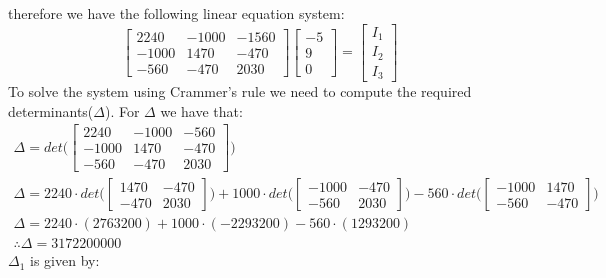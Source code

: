 \documentclass[letterpaper]{article}
\begin{document}
    therefore we have the following linear equation system:
    \[
        \begin{bmatrix}
            2240 & -1000 & -1560\\
            -1000 & 1470 & -470\\
            -560 & -470 & 2030
        \end{bmatrix}
    \begin{bmatrix}
        -5\\
        9\\
        0
    \end{bmatrix}
    =
    \begin{bmatrix}
        I_1\\
        I_2\\
        I_3
    \end{bmatrix}
\]
To solve the system using Crammer's rule we need to compute the required determinants($\Delta$). For
$\Delta$ we have that:
    \begin{gather*}
        \Delta = det\Bigg(
        \begin{bmatrix}
            2240 & -1000 & -560\\
            -1000 & 1470 & -470\\
            -560 & -470 & 2030
        \end{bmatrix}
        \Bigg)\\
        \Delta = 2240\cdot det\bigg(
        \begin{bmatrix}
            1470 & -470\\
            -470 & 2030
        \end{bmatrix}
        \bigg)
        +1000\cdot det\bigg(
        \begin{bmatrix}
            -1000 & -470\\
            -560 & 2030
        \end{bmatrix}
        \bigg)
        -560\cdot det\bigg(
        \begin{bmatrix}
            -1000 & 1470\\
            -560 & -470
        \end{bmatrix}
        \bigg)\\
        \Delta = 2240\cdot(2763200)+1000\cdot(-2293200)-560\cdot(1293200)\\
        \therefore\Delta = 3172200000
    \end{gather*}
$\Delta_1$ is given by:
\end{document}
